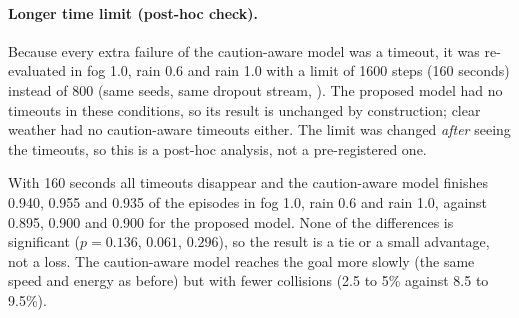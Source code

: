 \paragraph{Longer time limit (post-hoc check).} Because every extra failure of the caution-aware model was a timeout, it was re-evaluated in fog 1.0, rain 0.6 and rain 1.0 with a limit of 1600 steps (160 seconds) instead of 800 (same seeds, same dropout stream, ). The proposed model had no timeouts in these conditions, so its result is unchanged by construction; clear weather had no caution-aware timeouts either. The limit was changed \emph{after} seeing the timeouts, so this is a post-hoc analysis, not a pre-registered one.
\begin{table}[H]\centering\scriptsize
\caption{Caution-aware model with the 800-step and the 1600-step limit, next to the proposed model (800 steps). 200 episodes each.}\label{tab:cautionlonger}
\resizebox{\textwidth}{!}{}
\end{table}
\begin{table}[H]\centering\scriptsize
\caption{Paired comparison at the longer limit.}\label{tab:cautionlongerpaired}
\resizebox{\textwidth}{!}{}
\end{table}
With 160 seconds all timeouts disappear and the caution-aware model finishes 0.940, 0.955 and 0.935 of the episodes in fog 1.0, rain 0.6 and rain 1.0, against 0.895, 0.900 and 0.900 for the proposed model. None of the differences is significant ($p=0.136$, $0.061$, $0.296$), so the result is a tie or a small advantage, not a loss. The caution-aware model reaches the goal more slowly (the same speed and energy as before) but with fewer collisions (2.5 to 5\% against 8.5 to 9.5\%).

